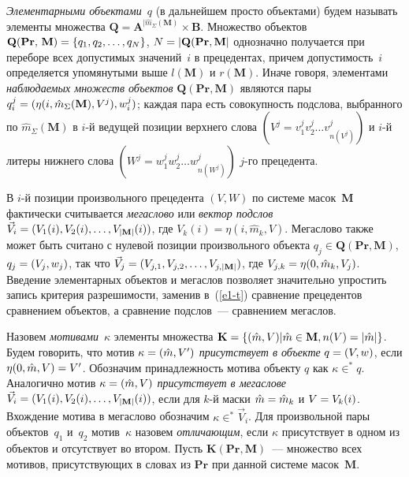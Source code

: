 \begin{multicols}{2}
\textit{Элементарными объектами}~$q$ (в дальнейшем прос\-то объектами)
будем называть элементы множества $\mathbf{Q}=\mathbf{A}^{\vert \hat{m}_\Sigma(\mathbf{M})}\times
\mathbf{B}$. Множество объектов $\mathbf{Q}(\mathbf{Pr},\,\mathbf{M})\hm=
\{q_1, q_2, \ldots , q_N\}$, $N\hm=\vert
\mathbf{Q}(\mathbf{Pr}, \mathbf{M}\vert$ однозначно получается при переборе всех до\-пус\-ти\-мых
значений~$i$ в прецедентах, причем допустимость~$i$ определяется
упомянутыми выше $l(\mathbf{M})$ и $r(\mathbf{M})$. Иначе говоря, элементами
\textit{наблюдаемых множеств объектов} $\mathbf{Q}(\mathbf{Pr},\mathbf{M})$
являются пары $q_i^j
\hm=(\eta (i,\hat{m}_\Sigma(\mathbf{M}),V^j),w_i^j)$; каждая пара есть совокупность
подслова, выбранного по $\hat{m}_\Sigma(\mathbf{M})$ в $i$-й ведущей позиции
верхнего слова $(V^j=v_1^j v_2^j\ldots v^j_{n(V^j)})$ и $i$-й литеры
нижнего слова $(W^j=w_1^j w_2^j\ldots w^j_{n(W^j)})$ $j$-го прецедента.

В $i$-й позиции произвольного прецедента $(V, W)$ по системе масок~\textbf{M}
фактически считывается \textit{мегаслово} или \textit{вектор подслов}
$\vec{V}_i \hm=(V_1(i),V_2(i),\ldots , V_{\vert \mathbf{M}\vert} (i))$, где
$V_k(i)=\eta(i,\hat{m}_k,V)$. Мегаслово также может быть считано с нулевой
позиции произвольного объекта $q_j\in \mathbf{Q}(\mathbf{Pr},\mathbf{M})$,
$q_j\hm=(V_j,w_j)$, так что
$\vec{V}_j\hm=(V_{j,1}, V_{j,2}, \ldots , V_{j,\vert \mathbf{M}\vert})$, где
$V_{j,k}\hm= \eta(0,\hat{m}_k,V_j)$. Введение элементарных объектов и
мегаслов позволяет значительно упростить запись критерия разрешимости,
заменив в~(\ref{e1-t}) сравнение прецедентов сравнением объектов, а
сравнение подслов~--- сравнением мегаслов.

Назовем \textit{мотивами}~$\kappa$ элементы множества
$\mathbf{K}\hm=\{(\hat{m},V)\vert \hat{m} \in \mathbf{M}, n(V)\hm=\vert \hat{m}\vert\}$. Будем
говорить, что мотив $\kappa\hm=(\hat{m},V^\prime)$ \textit{присутствует в
объекте} $q\hm=(V,w)$, если $\eta (0,\hat{m},V)\hm = V^\prime$. Обозначим
принадлежность мотива объекту $q$ как $\kappa\in^* q$. Аналогично мотив
$\kappa \hm=(\hat{m},V)$ \textit{присутствует в мегаслове} $\vec{V}_i \hm=
(V_1(i), V_2(i), \ldots , V_{\vert \mathbf{M}\vert}(i))$, если для $k$-й маски
$\hat{m}\hm=\hat{m}_k$ и $V\hm=V_k(i)$. Вхождение мотива в мегаслово
обозначим $\kappa\in^* \vec{V}_i$. Для произвольной пары объектов~$q_1$
и~$q_2$ мотив~$\kappa$ назовем \textit{отличающим}, если $\kappa$
присутствует в одном из объектов и отсутствует во втором. Пусть $\mathbf{K}(\mathbf{Pr},
\mathbf{M})$~--- множество всех мотивов, присутствующих в словах из $\mathbf{Pr}$ при
данной системе масок~$\mathbf{M}$.


\end{multicols}
